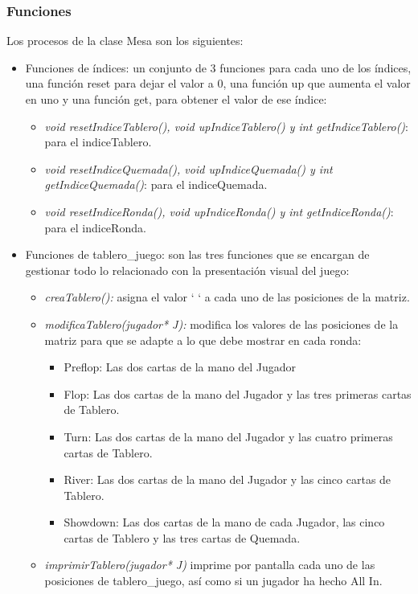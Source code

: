 \subsubsection{Funciones}
Los procesos de la clase Mesa son los siguientes:
\begin{itemize}
\item Funciones de índices: un conjunto de 3 funciones para cada uno de los índices, una función reset para dejar el valor a 0, una función up que aumenta el valor en uno y una función get, para obtener el valor de ese índice:
\begin{itemize}
\item \textit{void resetIndiceTablero(),	void upIndiceTablero() y int getIndiceTablero()}: para el indiceTablero.
\item \textit{void resetIndiceQuemada(),	void upIndiceQuemada() y int getIndiceQuemada()}: para el indiceQuemada.
\item \textit{void resetIndiceRonda(),	void upIndiceRonda() y int getIndiceRonda()}: para el indiceRonda.
 \end{itemize}
\item Funciones de tablero\_juego: son las tres funciones que se encargan de gestionar todo lo relacionado con la presentación visual del juego:
\begin{itemize}
\item \textit{creaTablero():} asigna el valor ‘ ‘ a cada uno de las posiciones de la matriz.
\item\textit{ modificaTablero(jugador* J):} modifica los valores de las posiciones de la matriz para que se adapte a lo que debe mostrar en cada ronda:
\begin{itemize}
\item Preflop: Las dos cartas de la mano del Jugador
\item Flop: Las dos cartas de la mano del Jugador y las tres primeras cartas de Tablero.
\item Turn: Las dos cartas de la mano del Jugador y las cuatro primeras cartas de Tablero.
\item River: Las dos cartas de la mano del Jugador y las cinco cartas de Tablero.
\item Showdown: Las dos cartas de la mano de cada Jugador, las cinco cartas de Tablero y las tres cartas de Quemada.
 \end{itemize}
\item \textit{imprimirTablero(jugador* J) }imprime por pantalla cada uno de las posiciones de tablero\_juego, así como si un jugador ha hecho All In.

\end{itemize}
\end{itemize}
